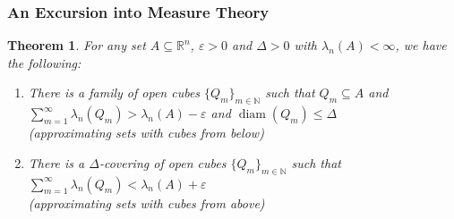 \documentclass{article}
\theoremstyle{plain}
\newtheorem{thm}{Theorem}[section]
\theoremstyle{definition}
\DeclareMathOperator{\diam}{diam}
\theoremstyle{remark}
\begin{document}
\subsubsection*{An Excursion into Measure Theory}

\begin{thm} \label{thm:cubes_approx}
    For any set $A \subseteq \mathbb{R}^n$, $\varepsilon>0$ and $\Delta >0$ with $\lambda _n(A)<\infty$, we have the following:
    \begin{enumerate}
        \item There is a family of open cubes $\{Q_m\}_{m \in \mathbb{N}}$ such that $Q_m \subseteq A$ and $\sum \limits _{m=1}^\infty\lambda_n(Q_m) > \lambda_n(A)-\varepsilon$ and $\diam (Q_m)\le \Delta$ \\ (approximating sets with cubes from below)
        \item There is a $\Delta$-covering of open cubes $\{Q_m\}_{m\in \mathbb{N}}$ such that $\sum \limits _{m=1}^\infty\lambda _n(Q_m) < \lambda _n(A)+\varepsilon$ 
        \\ (approximating sets with cubes from above)
    \end{enumerate}
    

\end{thm}
\end{document}

